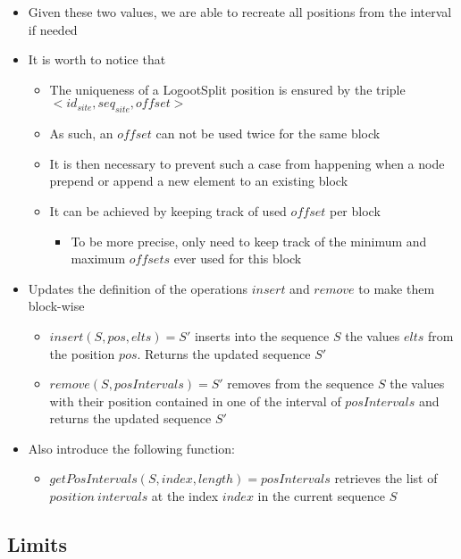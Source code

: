 \documentclass{article}
\begin{document}
\begin{itemize}
    \item Given these two values, we are able to recreate all positions from the interval if needed
    \item It is worth to notice that
    \begin{itemize}
        \item The uniqueness of a LogootSplit position is ensured by the triple $<id_{site}, seq_{site}, offset>$
        \item As such, an $offset$ can not be used twice for the same block
        \item It is then necessary to prevent such a case from happening when a node prepend or append a new element to an existing block
        \item It can be achieved by keeping track of used $offset$ per block
        \begin{itemize}
            \item To be more precise, only need to keep track of the minimum and maximum $offsets$ ever used for this block
        \end{itemize}
    \end{itemize}

    \item Updates the definition of the operations $insert$ and $remove$ to make them block-wise
    \begin{itemize}
        \item $insert(S, pos, elts) = S'$ inserts into the sequence $S$ the values $elts$ from the position $pos$. Returns the updated sequence $S'$
        \item $remove(S, posIntervals) = S'$ removes from the sequence $S$ the values with their position contained in one of the interval of $posIntervals$ and returns the updated sequence $S'$
    \end{itemize}
    \item Also introduce the following function:
    \begin{itemize}
        \item $getPosIntervals(S, index, length) = posIntervals$ retrieves the list of $position \ intervals$  at the index $index$ in the current sequence $S$
    \end{itemize}
\end{itemize}

\subsection{Limits}
\end{document}

